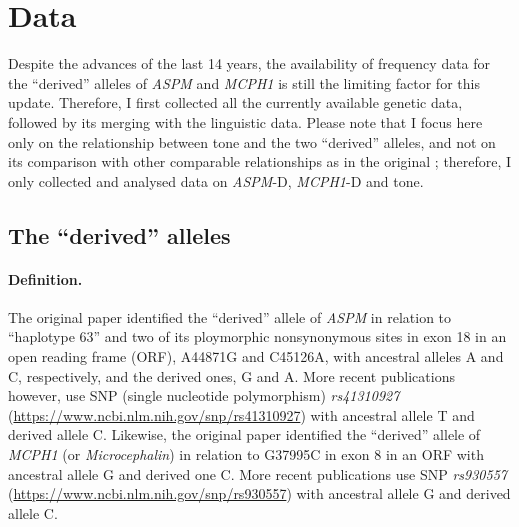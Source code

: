 \documentclass[twoside,onecolumn]{article}
\begin{document}

\section{Data}

Despite the advances of the last 14 years, the availability of frequency data for the ``derived'' alleles of \textit{ASPM} and \textit{MCPH1} is still the limiting factor for this update.
Therefore, I first collected all the currently available genetic data, followed by its merging with the linguistic data.
Please note that I focus here only on the relationship between tone and the two ``derived'' alleles, and not on its comparison with other comparable relationships as in the original \citet{dediu_ladd_2007}; therefore, I only collected and analysed data on \textit{ASPM}-D, \textit{MCPH1}-D and tone.

\subsection{The ``derived'' alleles}

\paragraph{Definition.}
The original \citet[p. 1720]{mekelbobrov_aspm_2005} paper identified the ``derived'' allele of \textit{ASPM} in relation to ``haplotype 63'' and two of its ploymorphic nonsynonymous sites in exon 18 in an open reading frame (ORF), A44871G and C45126A, with ancestral alleles A and C, respectively, and the derived ones, G and A.
More recent publications however, use SNP (single nucleotide polymorphism) \textit{rs41310927} (\url{https://www.ncbi.nlm.nih.gov/snp/rs41310927}) with ancestral allele T and derived allele C.
Likewise, the original \citet[p. 1717]{evans_microcephalin_2005} paper identified the ``derived'' allele of \textit{MCPH1} (or \textit{Microcephalin}) in relation to G37995C in exon 8 in an ORF with ancestral allele G and derived one C.
More recent publications use SNP \textit{rs930557} (\url{https://www.ncbi.nlm.nih.gov/snp/rs930557}) with ancestral allele G and derived allele C.
\end{document}
